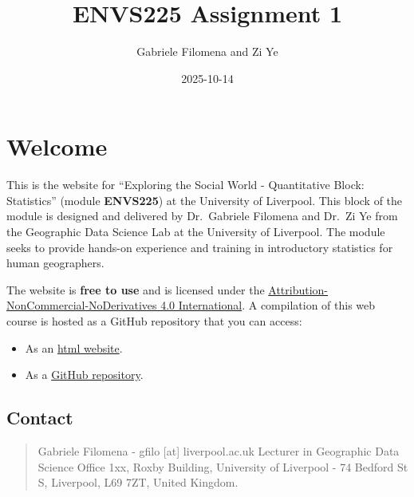 \documentclass[
  letterpaper,
  DIV=11,
  numbers=noendperiod]{scrreprt}
\title{ENVS225 Assignment 1}
\author{Gabriele Filomena and Zi Ye}
\date{2025-10-14}
\providecommand{\tightlist}{%
  \setlength{\itemsep}{0pt}\setlength{\parskip}{0pt}}\usepackage{longtable,booktabs,array}
\renewcommand*\contentsname{Table of contents}
\newcommand\contentsname{Table of contents}
\begin{document}
\maketitle

\renewcommand*\contentsname{Table of contents}
{
\hypersetup{linkcolor=}
\setcounter{tocdepth}{2}
\tableofcontents
}


\chapter*{Welcome}\label{welcome}


This is the website for ``Exploring the Social World - Quantitative
Block: Statistics'' (module \textbf{ENVS225}) at the University of
Liverpool. This block of the module is designed and delivered by
Dr.~Gabriele Filomena and Dr.~Zi Ye from the Geographic Data Science Lab
at the University of Liverpool. The module seeks to provide hands-on
experience and training in introductory statistics for human
geographers.

The website is \textbf{free to use} and is licensed under the
\href{https://creativecommons.org/licenses/by-nc-nd/4.0/}{Attribution-NonCommercial-NoDerivatives
4.0 International}. A compilation of this web course is hosted as a
GitHub repository that you can access:

\begin{itemize}
\tightlist
\item
  As an \href{https://gdsl-ul.github.io/stats}{html website}.
\item
  As a \href{https://github.com/GDSL-UL/stats}{GitHub repository}.
\end{itemize}

\section*{Contact}\label{contact}


\begin{quote}
Gabriele Filomena - gfilo {[}at{]} liverpool.ac.uk Lecturer in
Geographic Data Science Office 1xx, Roxby Building, University of
Liverpool - 74 Bedford St S, Liverpool, L69 7ZT, United Kingdom.
\end{quote}
\end{document}
